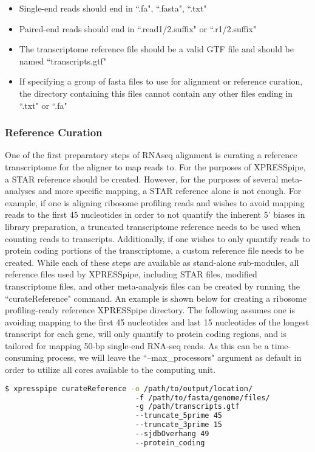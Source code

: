 \documentclass[11pt, a4paper, oneside]{article}
\begin{document}
\begin{itemize}
\item Single-end reads should end in ``.fa", ``.fasta", ``.txt"
\item Paired-end reads should end in ``.read1/2.suffix" or ``.r1/2.suffix"
\item The transcriptome reference file should be a valid GTF file and should be named ``transcripts.gtf"
\item If specifying a group of fasta files to use for alignment or reference curation, the directory containing this files cannot contain any other files ending in ``.txt" or ``.fa"
\end{itemize}

\subsubsection{Reference Curation}
One of the first preparatory steps of RNAseq alignment is curating a reference transcriptome for the aligner to map reads to. For the purposes of XPRESSpipe, a STAR reference should be created. However, for the purposes of several meta-analyses and more specific mapping, a STAR{} reference alone is not enough. For example, if one is aligning ribosome profiling reads and wishes to avoid mapping reads to the first 45 nucleotides in order to not quantify the inherent 5' biases in library preparation{}, a truncated transcriptome reference needs to be used when counting reads to transcripts. Additionally, if one wishes to only quantify reads to protein coding portions of the transcriptome, a custom reference file needs to be created. While each of these steps are available as stand-alone sub-modules, all reference files used by XPRESSpipe, including STAR files, modified transcriptome files, and other meta-analysis files can be created by running the ``curateReference" command. An example is shown below for creating a ribosome profiling-ready reference XPRESSpipe directory. The following assumes one is avoiding mapping to the first 45 nucleotides and last 15 nucleotides of the longest transcript for each gene, will only quantify to protein coding regions, and is tailored for mapping 50-bp single-end RNA-seq reads. As this can be a time-consuming process, we will leave the ``--max\_processors" argument as default in order to utilize all cores available to the computing unit.
\newline
\begin{lstlisting}[language=bash, caption=curateReference example]
$ xpresspipe curateReference -o /path/to/output/location/
                              -f /path/to/fasta/genome/files/
                              -g /path/transcripts.gtf
                              --truncate_5prime 45
                              --truncate_3prime 15
                              --sjdbOverhang 49
                              --protein_coding
\end{lstlisting}
\end{document}

